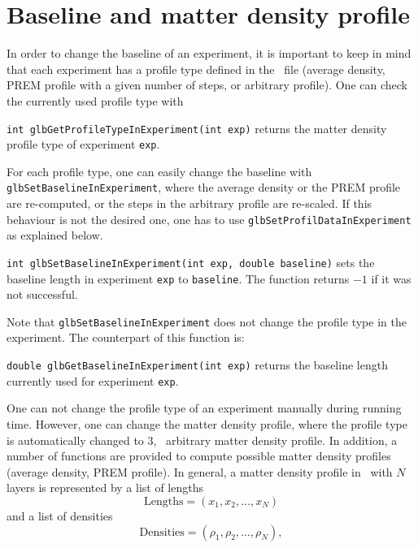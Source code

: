 \section{Baseline and matter density profile}
\label{sec:baselinemd}

In order to change the baseline of an experiment, it is important
to keep in mind that each experiment has a profile type defined
in the \AEDL\ file (average density, PREM profile with a given
number of steps, or arbitrary profile). One can check the currently
used profile type with
\begin{function}
{\tt int glbGetProfileTypeInExperiment(int exp)} returns the matter density profile
type of experiment {\tt exp}.
\end{function}
For each profile type, one can easily change the baseline with {\tt glbSetBaselineInExperiment},
where the average density or the PREM profile are re-computed, or the
steps in the arbitrary profile are re-scaled. If this behaviour is 
not the desired one, one has to use {\tt glbSetProfilDataInExperiment}
as explained below.
\begin{function}
{\tt int glbSetBaselineInExperiment(int exp, double baseline)}
sets the baseline length in experiment {\tt exp} to {\tt baseline}.
The function returns $-1$ if it was not successful.
\end{function}
Note that {\tt glbSetBaselineInExperiment} does not change the
profile type in the experiment. The counterpart of this function is:
\begin{function}
{\tt double glbGetBaselineInExperiment(int exp)} returns the
baseline length currently used for experiment {\tt exp}.
\end{function}
One can not change the profile type of an experiment manually
during running time. However, one can change the matter density
profile, where the profile type is automatically changed to 3, \ie\ 
arbitrary matter density profile. In addition, a number of functions 
are provided to compute possible matter density profiles (average density,
PREM profile). In general, a matter density profile in \GLOBES\ with
$N$ layers is represented by a list of lengths 
\begin{equation}
\mathrm{Lengths} = (x_1,x_2, \hdots, x_N) 
\end{equation}
and a list of densities
\begin{equation}
\mathrm{Densities} = (\rho_1,\rho_2, \hdots, \rho_N), 
\end{equation}
